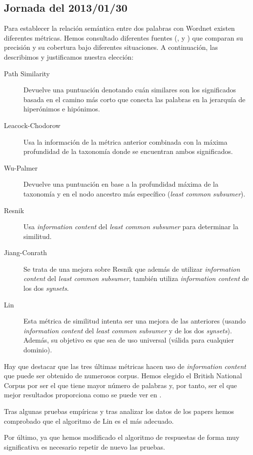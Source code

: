 \documentclass[12pt,a4paper,titlepage]{article}
\begin{document}
\subsection{Jornada del 2013/01/30}
Para establecer la relación semántica entre dos palabras con Wordnet existen diferentes métricas. Hemos consultado diferentes fuentes (\cite{wn1}, \cite{wn2} y \cite{wn3}) que comparan su precisión y su cobertura bajo diferentes situaciones. A continuación, las describimos y justificamos nuestra elección:

\begin{description}
\item[Path Similarity] Devuelve una puntuación denotando cuán similares son los significados basada en el camino más corto que conecta las palabras en la jerarquía de hiperónimos e hipónimos.
\item[Leacock-Chodorow] Usa la información de la métrica anterior combinada con la máxima profundidad de la taxonomía donde se encuentran ambos significados.
\item[Wu-Palmer] Devuelve una puntuación en base a la profundidad máxima de la taxonomía y en el nodo ancestro más específico (\emph{least common subsumer}).
\item[Resnik] Usa \emph{information content} del \emph{least common subsumer} para determinar la similitud.
\item[Jiang-Conrath] Se trata de una mejora sobre Resnik que además de utilizar \emph{information content} del \emph{least common subsumer}, también utiliza \emph{information content} de los dos \emph{synsets}.
\item[Lin] Esta métrica de similitud intenta ser una mejora de las anteriores (usando \emph{information content} del \emph{least common subsumer} y de los dos \emph{synsets}). Además, su objetivo es que sea de uso universal (válida para cualquier dominio).
\end{description}

Hay que destacar que las tres últimas métricas hacen uso de \emph{information content} que puede ser obtenido de numerosos corpus. Hemos elegido el British National Corpus por ser el que tiene mayor número de palabras y, por tanto, ser el que mejor resultados proporciona como se puede ver en \cite{wn1}.

Tras algunas pruebas empíricas y tras analizar los datos de los papers hemos comprobado que el algoritmo de Lin es el más adecuado.

Por último, ya que hemos modificado el algoritmo de respuestas de forma muy significativa es necesario repetir de nuevo las pruebas.
\end{document}
